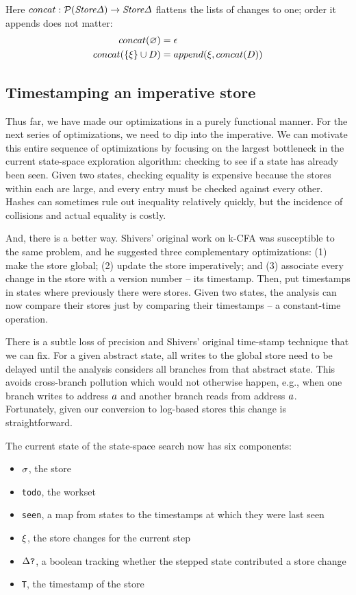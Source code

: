 \documentclass[preprint,onecolumn,9pt]{sigplanconf} %
\begin{document}
Here $concat : \mathcal{P}(\mathit{Store\Delta}) \to \mathit{Store\Delta}$ flattens the lists
of changes to one; order it appends does not matter:
\begin{align*}
concat(\varnothing) &= \epsilon \\
concat(\{\xi\}\cup D) &= append(\xi, concat(D))
\end{align*}


\subsection{Timestamping an imperative store}

Thus far, we have made our optimizations in a purely functional
manner. For the next series of optimizations, we need to dip into the
imperative. We can motivate this entire sequence of optimizations by
focusing on the largest bottleneck in the current state-space
exploration algorithm: checking to see if a state has already been
seen. Given two states, checking equality is expensive because the
stores within each are large, and every entry must be checked against
every other. Hashes can sometimes rule out inequality relatively
quickly, but the incidence of collisions and actual equality is
costly.

And, there is a better way. Shivers' original work on k-CFA was
susceptible to the same problem, and he suggested three complementary
optimizations: (1) make the store global; (2) update the store
imperatively; and (3) associate every change in the store with a
version number -- its timestamp. Then, put timestamps in states
where previously there were stores. Given two states, the analysis can
now compare their stores just by comparing their timestamps -- a
constant-time operation.

There is a subtle loss of precision and Shivers' original time-stamp
technique that we can fix. For a given abstract state, all writes to
the global store need to be delayed until the analysis considers all
branches from that abstract state. This avoids cross-branch pollution
which would not otherwise happen, e.g., when one branch writes to
address $a$ and another branch reads from address
$a$. Fortunately, given our conversion to log-based stores this
change is straightforward.

The current state of the state-space search now has six components:

\begin{itemize}
 \item{$\sigma$, the store}
 \item{{\tt todo}, the workset}
 \item{{\tt seen}, a map from states to the timestamps at which they were last seen}
 \item{$\xi$, the store changes for the current step}
 \item{$\Delta\mbox{{\tt ?}}$, a boolean tracking whether the stepped state contributed a store change}
 \item{{\tt T}, the timestamp of the store}
\end{itemize}
\end{document}
